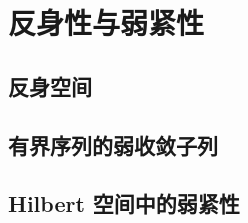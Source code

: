 \section{反身性与弱紧性}
\label{b1:sec:0904}


\subsection{反身空间}
\label{b1:subsec:090401}

\subsection{有界序列的弱收敛子列}
\label{b1:subsec:090402}

\subsection{Hilbert 空间中的弱紧性}
\label{b1:subsec:090403}



